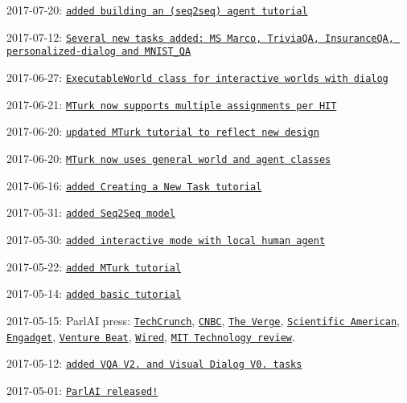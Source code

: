 2017-\/07-\/20\+: \href{http://www.parl.ai/static/docs/seq2seq_tutorial.html}{\tt added building an (seq2seq) agent tutorial}

2017-\/07-\/12\+: \href{https://github.com/facebookresearch/ParlAI/blob/master/parlai/tasks/task_list.py}{\tt Several new tasks added\+: MS Marco, Trivia\+QA, Insurance\+QA, personalized-\/dialog and M\+N\+I\+S\+T\+\_\+\+QA}

2017-\/06-\/27\+: \href{https://github.com/facebookresearch/ParlAI/pull/170}{\tt Executable\+World class for interactive worlds with dialog}

2017-\/06-\/21\+: \href{https://github.com/facebookresearch/ParlAI/pull/156}{\tt M\+Turk now supports multiple assignments per H\+IT}

2017-\/06-\/20\+: \href{http://parl.ai/static/docs/mturk.html}{\tt updated M\+Turk tutorial to reflect new design}

2017-\/06-\/20\+: \href{https://github.com/facebookresearch/ParlAI/pull/128}{\tt M\+Turk now uses general world and agent classes}

2017-\/06-\/16\+: \href{http://parl.ai/static/docs/task_tutorial.html}{\tt added Creating a New Task tutorial}

2017-\/05-\/31\+: \href{https://github.com/facebookresearch/ParlAI/pull/96}{\tt added Seq2\+Seq model}

2017-\/05-\/30\+: \href{https://github.com/facebookresearch/ParlAI/pull/110}{\tt added interactive mode with local human agent}

2017-\/05-\/22\+: \href{http://parl.ai/static/docs/mturk.html}{\tt added M\+Turk tutorial}

2017-\/05-\/14\+: \href{http://parl.ai/static/docs/basic_tutorial.html}{\tt added basic tutorial}

2017-\/05-\/15\+: Parl\+AI press\+: \href{https://techcrunch.com/2017/05/15/facebooks-parlai-is-where-researchers-will-push-the-boundaries-of-conversational-ai/}{\tt Tech\+Crunch}, \href{http://www.cnbc.com/2017/05/12/facebook-releases-parlai-to-speed-realistic-chat-bot-development.html}{\tt C\+N\+BC}, \href{https://www.theverge.com/2017/5/15/15640886/facebook-parlai-chatbot-research-ai-chatbot}{\tt The Verge}, \href{https://www.scientificamerican.com/article/facebook-wants-to-make-chatbots-more-conversational/}{\tt Scientific American}, \href{https://www.engadget.com/2017/05/15/facebook-parlAI-chatbot-training/}{\tt Engadget}, \href{https://venturebeat.com/2017/05/15/facebook-to-launch-parlai-a-testing-ground-for-ai-and-bots/}{\tt Venture Beat}, \href{https://www.wired.com/2017/05/inside-facebooks-training-ground-making-chatbots-chattier/}{\tt Wired}, \href{https://www.technologyreview.com/s/607854/facebook-wants-to-merge-ai-systems-for-a-smarter-chatbot/}{\tt M\+IT Technology review}.

2017-\/05-\/12\+: \href{https://github.com/facebookresearch/ParlAI/pull/54}{\tt added V\+QA V2. and Visual Dialog V0. tasks}

2017-\/05-\/01\+: \href{https://code.facebook.com/posts/266433647155520/parlai-a-new-software-platform-for-dialog-research/}{\tt Parl\+AI released!} 